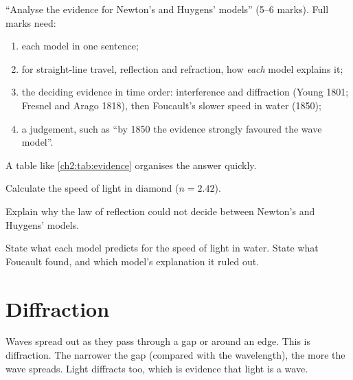 \begin{examtip}
``Analyse the evidence for Newton's and Huygens' models'' (5--6 marks). Full marks need:
\begin{enumerate}
  \item each model in one sentence;
  \item for straight-line travel, reflection and refraction, how \emph{each} model
        explains it;
  \item the deciding evidence in time order: interference and diffraction (Young 1801;
        Fresnel and Arago 1818), then Foucault's slower speed in water (1850);
  \item a judgement, such as ``by 1850 the evidence strongly favoured the wave model''.
\end{enumerate}
A table like \cref{ch2:tab:evidence} organises the answer quickly.
\end{examtip}

\begin{quickcheck}
  \item Calculate the speed of light in diamond ($n = 2.42$).
  \item Explain why the law of reflection could not decide between Newton's and
        Huygens' models.
  \item State what each model predicts for the speed of light in water. State what
        Foucault found, and which model's explanation it ruled out.
\end{quickcheck}

\section{Diffraction}\label{ch2:sec:diffraction}

\begin{bigidea}
Waves spread out as they pass through a gap or around an edge. This is diffraction. The
narrower the gap (compared with the wavelength), the more the wave spreads. Light
diffracts too, which is evidence that light is a wave.
\end{bigidea}

\begin{keywords}
\end{keywords}

